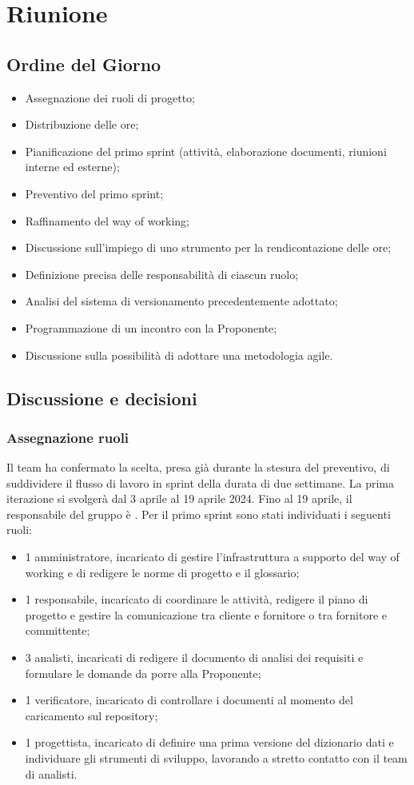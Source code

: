 \section{Riunione}
\subsection{Ordine del Giorno}
\begin{itemize}
	\item Assegnazione dei ruoli di progetto;
	\item Distribuzione delle ore;
	\item Pianificazione del primo sprint (attività, elaborazione documenti, riunioni interne ed esterne);
	\item Preventivo del primo sprint;
	\item Raffinamento del way of working;
	\item Discussione sull'impiego di uno strumento per la rendicontazione delle ore;
	\item Definizione precisa delle responsabilità di ciascun ruolo;
	\item Analisi del sistema di versionamento precedentemente adottato;
	\item Programmazione di un incontro con la Proponente;
	\item Discussione sulla possibilità di adottare una metodologia agile.
\end{itemize}

\subsection{Discussione e decisioni}

\subsubsection{Assegnazione ruoli}
Il team ha confermato la scelta, presa già durante la stesura del preventivo, di suddividere il flusso di lavoro in sprint della durata di due settimane. La prima iterazione si svolgerà dal 3 aprile al 19 aprile 2024. Fino al 19 aprile, il responsabile del gruppo è \riccardo. Per il primo sprint sono stati individuati i seguenti ruoli:
\begin{itemize}
	\item 1 amministratore, incaricato di gestire l'infrastruttura a supporto del way of working e di redigere le norme di progetto e il glossario;
	\item 1 responsabile, incaricato di coordinare le attività, redigere il piano di progetto e gestire la comunicazione tra cliente e fornitore o tra fornitore e committente;
	\item 3 analisti, incaricati di redigere il documento di analisi dei requisiti e formulare le domande da porre alla Proponente;
	\item 1 verificatore, incaricato di controllare i documenti al momento del caricamento sul repository;
	\item 1 progettista, incaricato di definire una prima versione del dizionario dati e individuare gli strumenti di sviluppo, lavorando a stretto contatto con il team di analisti.
\end{itemize}

